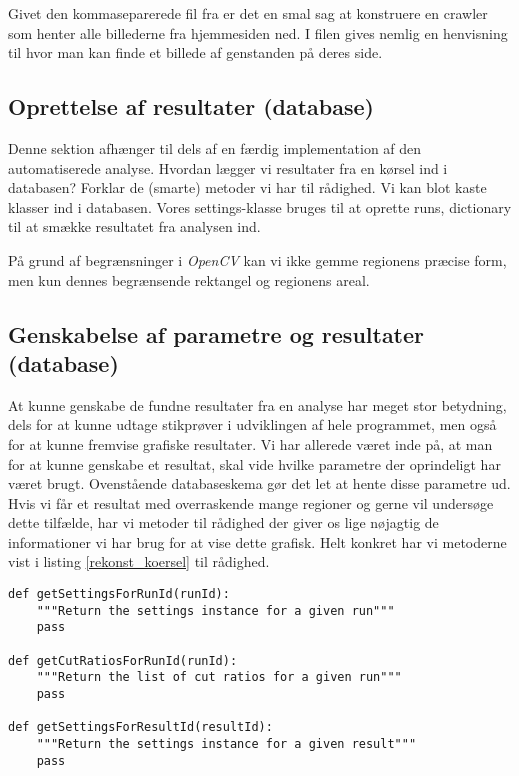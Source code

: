 {Givet den kommaseparerede fil fra \cite{wgahu} er det en smal sag at
konstruere en crawler som henter alle billederne fra hjemmesiden ned. I
filen gives nemlig en henvisning til hvor man kan finde et billede af
genstanden på deres side.

\subsection{Oprettelse af resultater (database)}
Denne sektion afhænger til dels af en færdig implementation af den
automatiserede analyse. Hvordan lægger vi resultater fra en kørsel ind i
databasen? Forklar de (smarte) metoder vi har til rådighed. Vi kan blot
kaste klasser ind i databasen. Vores settings-klasse bruges til at
oprette runs, dictionary til at smække resultatet fra analysen ind.

På grund af begrænsninger i \emph{OpenCV} kan vi ikke gemme regionens
præcise form, men kun dennes begrænsende rektangel og regionens areal.

\subsection{Genskabelse af parametre og resultater (database)}
At kunne genskabe de fundne resultater fra en analyse har meget stor
betydning, dels for at kunne udtage stikprøver i udviklingen af hele
programmet, men også for at kunne fremvise grafiske resultater. Vi har
allerede været inde på, at man for at kunne genskabe et resultat, skal
vide hvilke parametre der oprindeligt har været brugt. Ovenstående
databaseskema gør det let at hente disse parametre ud. Hvis vi får et
resultat med overraskende mange regioner og gerne vil undersøge dette
tilfælde, har vi metoder til rådighed der giver os lige nøjagtig de
informationer vi har brug for at vise dette grafisk. Helt konkret har vi
metoderne vist i listing \ref{rekonst_koersel} til rådighed.

\vspace{0.5cm}
\begin{lstlisting}[caption={Metoder til rekonstruktion af kørsler},captionpos=b,label={rekonst_koersel},numbers=none]
def getSettingsForRunId(runId):
    """Return the settings instance for a given run"""
    pass

def getCutRatiosForRunId(runId):
    """Return the list of cut ratios for a given run"""
    pass

def getSettingsForResultId(resultId):
    """Return the settings instance for a given result"""
    pass


\end{lstlisting}}

